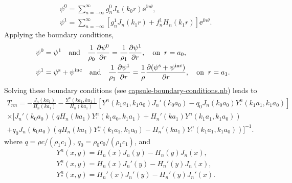 \documentclass[ 12pt, a4paper]{article}
\begin{document}
\begin{align}
  & \psi^0 = \sum_{n=-\infty}^\infty g_n^0 J_{n}(k_0 r) \ee^{\ii n \theta},
  \\
  & \psi^1 = \sum_{n=-\infty}^\infty \left [ g_n^1 J_{n}(k_1 r) + f_n^1 H_{n}(k_1 r) \right ] \ee^{\ii n \theta}.
\end{align}
Applying the boundary conditions,
\begin{align}
  	& \psi^0 = \psi^1 \quad \text{and} \quad \frac{1}{\rho_0} \frac{\partial \psi^0}{\partial r} = \frac{1}{\rho_1} \frac{\partial \psi^1}{\partial r}, \quad \text{on} \;\; r = a_0,
    \label{eqn:inner_bc}
    \\
  	& \psi^1 = \psi^{\mathrm{s}} + \psi^{\mathrm{inc}} \quad \text{and} \quad \frac{1}{\rho_1} \frac{\partial \psi^1}{\partial r} = \frac{1}{\rho} \frac{\partial (\psi^{\mathrm{s}} + \psi^{\mathrm{inc}})}{\partial r}, \quad \text{on} \;\; r = a_1.
    \label{eqn:outer_bc}
\end{align}
Solving these boundary conditions (see \href{capsule-boundary-conditions.nb}{capsule-boundary-conditions.nb}) leads to
\begin{multline}
  T_{nn} = - \frac{J_n(k a_1)}{H_n(k a_1)} - \frac{Y^n_{'}(k a_1, k a_1)}{H_n(ka_1)} \left[Y^n(k_1 a_1,k_1 a_0) J_n'(k_0 a_0) - q_0 J_n(k_0 a_0) Y^n_{'}(k_1 a_1,k_1 a_0) \right]
  \\ \times \big[
    J_n'(k_0 a_0)(q H_n(k a_1)Y^n_{'}(k_1 a_0,k_1 a_1) + H_n'(k a_1) Y^n(k_1 a_1,k_1 a_0))
    \\
    + q_0 J_n(k_0 a_0)(q H_n(k a_1)Y^n_{''}(k_1 a_1,k_1 a_0) - H_n'(k a_1) Y^n_{'}(k_1 a_1, k_1 a_0))
  \big]^{-1}.
\end{multline}
where $q = \rho c/(\rho_1 c_1)$, $q_0 = \rho_0 c_0/( \rho_1 c_1)$, and
\begin{align}
  & Y^n(x,y) = H_n(x) J_n(y) - H_n(y) J_n(x), \\
  & Y^n_{'}(x,y) = H_n(x) J_n'(y) - H_n'(y) J_n(x), \\
  & Y^n_{''}(x,y) = H_n'(x) J_n'(y) - H_n'(y) J_n'(x).
\end{align}

%
\end{document}
